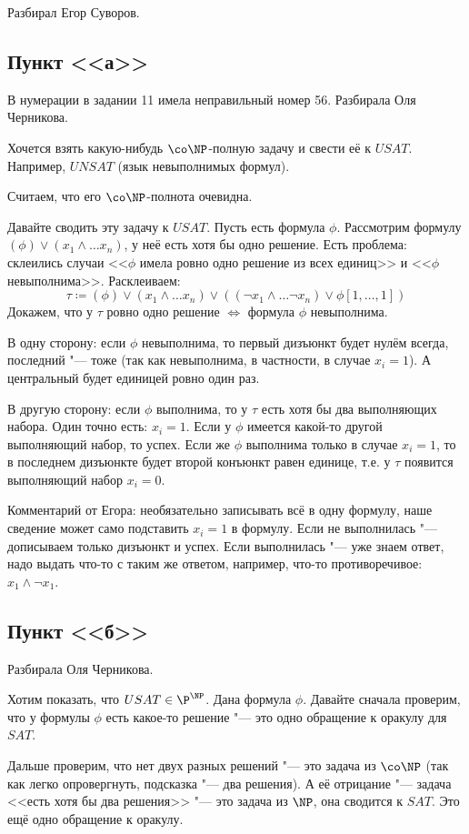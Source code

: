 	Разбирал Егор Суворов.

	\TODO

	\subsection{Пункт <<а>>}
	В нумерации в задании 11 имела неправильный номер 56.
	Разбирала Оля Черникова.

	Хочется взять какую-нибудь $\co\NP$-полную задачу и свести её к $USAT$.
	Например, $UNSAT$ (язык невыполнимых формул).
	\begin{Rem}
		Считаем, что его $\co\NP$-полнота очевидна.
		\TODO
	\end{Rem}
	Давайте сводить эту задачу к $USAT$.
	Пусть есть формула $\phi$.
	Рассмотрим формулу $(\phi) \lor (x_1 \land \dots x_n)$, у неё есть хотя бы одно решение.
	Есть проблема: склеились случаи <<$\phi$ имела ровно одно решение из всех единиц>> и <<$\phi$ невыполнима>>.
	Расклеиваем:
	\[
		\tau \coloneq (\phi) \lor (x_1 \land \dots x_n) \lor ((\lnot x_1 \land \dots \lnot x_n) \lor \phi[1, \dots, 1])
	\]
	Докажем, что у $\tau$ ровно одно решение $\iff$ формула $\phi$ невыполнима.

	В одну сторону: если $\phi$ невыполнима, то первый дизъюнкт будет нулём всегда, последний "--- тоже (так как невыполнима, в частности, в случае $x_i=1$).
	А центральный будет единицей ровно один раз.

	В другую сторону: если $\phi$ выполнима, то у $\tau$ есть хотя бы два выполняющих набора.
	Один точно есть: $x_i=1$.
	Если у $\phi$ имеется какой-то другой выполняющий набор, то успех.
	Если же $\phi$ выполнима только в случае $x_i=1$, то в последнем дизъюнкте будет второй конъюнкт равен единице,
	т.е. у $\tau$ появится выполняющий набор $x_i=0$.

	\begin{Rem}
		Комментарий от Егора: необязательно записывать всё в одну формулу, наше сведение может само подставить $x_i=1$ в формулу.
		Если не выполнилась "--- дописываем только дизъюнкт и успех.
		Если выполнилась "--- уже знаем ответ, надо выдать что-то с таким же ответом, например, что-то противоречивое: $x_1 \land \lnot x_1$.
	\end{Rem}

	\subsection{Пункт <<б>>}
	Разбирала Оля Черникова.

	Хотим показать, что $USAT \in \P^{\NP}$.
	Дана формула $\phi$.
	Давайте сначала проверим, что у формулы $\phi$ есть какое-то решение "--- это одно обращение к оракулу для $SAT$.

	Дальше проверим, что нет двух разных решений "--- это задача из $\co\NP$ (так как легко опровергнуть, подсказка "--- два решения).
	А её отрицание "--- задача <<есть хотя бы два решения>> "--- это задача из $\NP$, она сводится к $SAT$.
	Это ещё одно обращение к оракулу.

